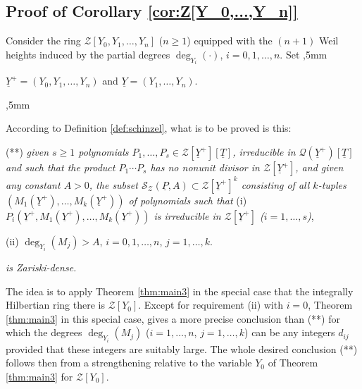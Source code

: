 \documentclass[11pt,a4paper,reqno]{amsart}
\newtheorem{cor}[thm]{Corollary}
\theoremstyle{definition}
\begin{document}


\subsection{Proof of Corollary \ref{cor:Z[Y_0,...,Y_n]}} \label{ssec:pf-corollary1.9}
Consider the ring ${\mathcal Z}[Y_0, Y_1,\ldots,Y_n]$ ($n\geq 1$) equipped with the $(n+1)$ Weil heights induced by the partial degrees $\deg_{Y_i}(\cdot)$, $i=0,1,\ldots,n$. Set 
,5mm
\centerline{$\underline Y^+=(Y_0,Y_1,\ldots,Y_n)$ and $\underline Y=(Y_1,\ldots,Y_n)$.} 
,5mm

\noindent
According to Definition \ref{def:schinzel}, what is to be proved is this:
\vskip 1mm

\noindent
(**) \emph{given $s\geq 1$ polynomials $P_1,\ldots,P_s \in {\mathcal Z}[\underline Y^+][\underline T]$, irreducible in $\mathcal{Q}(\underline Y^+)[\underline T]$
and such that the product $P_1\cdots P_s$ has no nonunit divisor in ${\mathcal Z}[\underline Y^+]$, and given any constant $A>0$, the subset ${\mathcal S}_{\mathcal{Z}}(\underline P,A)\subset {\mathcal Z}[\underline Y^+]^k$ consisting of all $k$-tuples $(M_1(\underline Y^+),\ldots,M_k(\underline Y^+))$ 
of polynomials such that}
\vskip 1mm
\noindent
{\rm (i)} \emph{$P_i(\underline Y^+, M_1(\underline Y^+),\ldots,M_k(\underline Y^+))$ is irreducible in ${\mathcal Z}[\underline Y^+]$ ($i=1,\ldots,s$)},
\vskip 1mm 

\noindent
{\rm (ii)} $\deg_{Y_i}(M_j) >A$, $i=0,1,\ldots,n$, $j=1,\ldots,k$.
\vskip 1mm 


\noindent
\emph{is Zariski-dense.}
\vskip 1mm


The idea is to apply Theorem \ref{thm:main3} in the special case that the integrally Hilbertian ring there is ${\mathcal Z}[Y_0]$. Except for requirement (ii) with $i=0$, Theorem \ref{thm:main3} in this special case, gives a more precise conclusion than (**) for which the degrees $\deg_{Y_i}(M_j)$ ($i=1,\ldots,n$, $j=1,\ldots,k$) can be any integers $d_{ij}$ provided that these integers are suitably large. The whole desired conclusion (**) follows then from a strengthening relative to the variable $Y_0$ of Theorem \ref{thm:main3} 
for ${\mathcal Z}[Y_0]$. 
\end{document}
